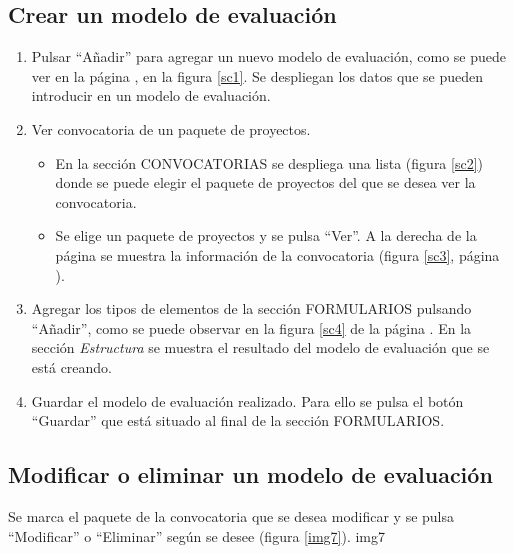 \documentclass[11pt,a4paper,spanish,twoside]{book}
\begin{document}
\subsection{Crear un modelo de evaluación}
\begin{enumerate}
\item Pulsar ``Añadir'' para agregar un nuevo modelo de evaluación, como se 
  puede ver en la página \pageref{sc1}, en la figura \ref{sc1}. Se despliegan
  los datos que se pueden introducir en un modelo de evaluación.
  

\item Ver convocatoria de un paquete de proyectos.
  \begin{itemize}
  \item En la sección CONVOCATORIAS se despliega una lista (figura \ref{sc2}) 
    donde se puede elegir el paquete de proyectos del que se desea ver la 
    convocatoria.


  \item Se elige un paquete de proyectos y se pulsa ``Ver''. A la derecha de la 
    página se muestra la información de la convocatoria (figura \ref{sc3},
    página \pageref{sc3}).

  \end{itemize}

\item Agregar los tipos de elementos de la sección FORMULARIOS pulsando 
  ``Añadir'', como se puede observar en la figura \ref{sc4} de la página
  \pageref{sc4}. En la sección 
  \emph{Estructura} se muestra el resultado del modelo de evaluación que se
  está creando.


\item Guardar el modelo de evaluación realizado. Para ello se pulsa el botón 
  ``Guardar'' que está situado al final de la sección FORMULARIOS.
\end{enumerate}

\subsection{Modificar o eliminar un modelo de evaluación}
Se marca el paquete de la convocatoria que se desea modificar y se pulsa 
``Modificar'' o ``Eliminar'' según se desee (figura \ref{img7}).
{img7}
\end{document}
